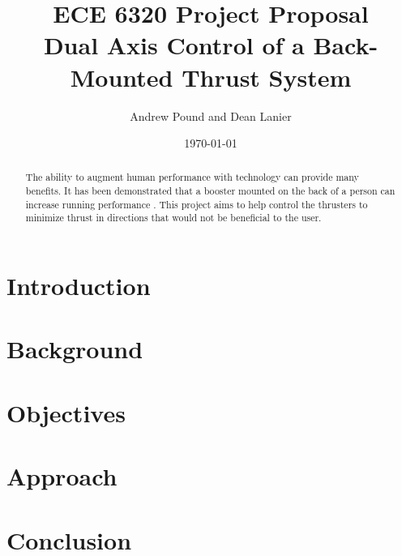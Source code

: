 \documentclass[10pt]{article}
\title{ECE 6320 Project Proposal\\
  Dual Axis Control of a Back-Mounted Thrust System
}
\author{Andrew Pound and Dean Lanier}
\date{\today}
\begin{document}
\maketitle

\begin{abstract}
The ability to augment human performance with technology can provide
many benefits.  It has been demonstrated that a booster mounted on the
back of a person can increase running performance \cite{nada}.  This
project aims to help control the thrusters to minimize thrust in
directions that would not be beneficial to the user.

\end{abstract}


\section{Introduction}%

\section{Background}

\section{Objectives}

\section{Approach}

\section{Conclusion}

% 
% 
\end{document}
